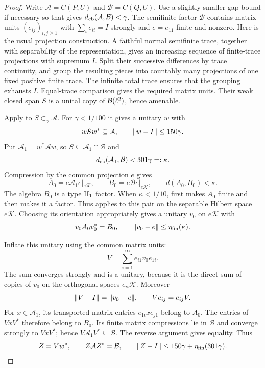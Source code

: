 \begin{proof}
Write $\mathcal A=C(P,U)$ and $\mathcal B=C(Q,U)$.
Use a slightly smaller gap bound if necessary so that
 gives $d_{\mathrm{cb}}(\mathcal A,\mathcal B)<\gamma$.
The semifinite factor $\mathcal B$ contains matrix units
$(e_{ij})_{i,j\ge1}$ with $\sum_i e_{ii}=I$ strongly and $e=e_{11}$
finite and nonzero.  Here is the usual projection construction.
A faithful normal semifinite trace, together with separability of
the representation, gives an increasing sequence of finite-trace
projections with supremum $I$.  Split their successive differences
by trace continuity, and group the resulting pieces into countably
many projections of one fixed positive finite trace.  The infinite
total trace ensures that the grouping exhausts $I$.  Equal-trace
comparison gives the required matrix units.  Their weak closed span
$S$ is a unital copy of $\mathcal B(\ell^2)$, hence amenable.

Apply  to $S\subset_\gamma\mathcal A$.
For $\gamma<1/100$ it gives a unitary $w$ with
\[
 wSw^*\subseteq\mathcal A,\qquad \lVert w-I\rVert\le150\gamma.
\]
Put $\mathcal A_1=w^*\mathcal A w$, so
$S\subseteq\mathcal A_1\cap\mathcal B$ and
\begin{equation}\label{eq:core-aligned-gap}
 d_{\mathrm{cb}}(\mathcal A_1,\mathcal B)<301\gamma=:\kappa.
\end{equation}
Compression by the common projection $e$ gives
\[
 A_0=e\mathcal A_1e|_{e\mathcal K},\qquad
 B_0=e\mathcal Be|_{e\mathcal K},\qquad
 d(A_0,B_0)<\kappa.
\]
The algebra $B_0$ is a type $\mathrm{II}_1$ factor.  When $\kappa<1/10$,
 first makes $A_0$ finite and then
makes it a factor.  Thus  applies to this pair on
the separable Hilbert space $e\mathcal K$.  Choosing its orientation
appropriately gives a unitary $v_0$ on $e\mathcal K$ with
\[
 v_0A_0v_0^*=B_0,
 \qquad \lVert v_0-e\rVert\le\eta_{\rm fin}(\kappa).
\]

Inflate this unitary using the common matrix units:
\begin{equation}\label{eq:core-inflated-unitary}
 V=\sum_{i=1}^{\infty}e_{i1}v_0e_{1i}.
\end{equation}
The sum converges strongly and is a unitary, because it is the direct
sum of copies of $v_0$ on the orthogonal spaces $e_{ii}\mathcal K$.
Moreover
\[
 \lVert V-I\rVert=\lVert v_0-e\rVert,\qquad Ve_{ij}=e_{ij}V.
\]
For $x\in\mathcal A_1$, its transported matrix entries
$e_{1i}xe_{j1}$ belong to $A_0$.  The entries of $VxV^*$ therefore
belong to $B_0$.  Its finite matrix compressions lie in $\mathcal B$
and converge strongly to $VxV^*$; hence $V\mathcal A_1V^*\subseteq
\mathcal B$.  The reverse argument gives equality.  Thus
\begin{equation}\label{eq:core-full-unitary}
 Z=Vw^*,\qquad Z\mathcal A Z^*=\mathcal B,
 \qquad \lVert Z-I\rVert\le150\gamma+\eta_{\rm fin}(301\gamma).
\end{equation}


\end{proof}
